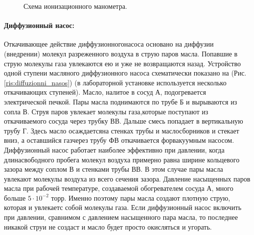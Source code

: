 \documentclass[a4paper, 12pt]{article}
\begin{document}
    \vspace{1cm}

    \begin{figure}[h]
        \caption{Схема ионизационного манометра.}
        \label{ris:ionizacionni_monometr}
    \end{figure}

    \newpage

    \paragraph{Диффузионный насос:}
    Откачивающее действие диффузионногонасоса основано на диффузии (внедрении) молекул разреженного воздуха в струю паров масла. Попавшие в струю молекулы газа увлекаются ею и уже не возвращаются назад. Устройство одной ступени масляного диффузионного насоса схематически показано на (Рис. \ref{ris:diffuzionni_nasos}) (в лабораторной установке используется несколько откачивающих ступеней). Масло, налитое в сосуд А, подогревается электрической печкой. Пары масла поднимаются по трубе Б и вырываются из сопла В. Струя паров увлекает молекулы газа,которые поступают из откачиваемого сосуда через трубку ВВ. Дальше смесь попадает в вертикальную трубу Г. Здесь масло осаждаетсяна стенках трубы и маслосборников и стекает вниз, а оставшийся газчерез трубу ФВ откачивается форвакуумным насосом. Диффузионный насос работает наиболее эффективно при давлении, когда длинасвободного пробега молекул воздуха примерно равна ширине кольцевого зазора между соплом В и стенками трубы ВВ. В этом случае пары масла увлекают молекулы воздуха из всего сечения зазора. Давление насыщенных паров масла при рабочей температуре, создаваемой обогревателем сосуда А, много больше $5\cdot10^{-2}$ торр. Именно поэтому пары масла создают плотную струю, которая и увлекаетс собой молекулы газа. Если диффузионный насос включить при давлении, сравнимом с давлением насыщенного пара масла, то последнее никакой струи не создаст и масло будет просто окисляться и угорать.
\end{document}
